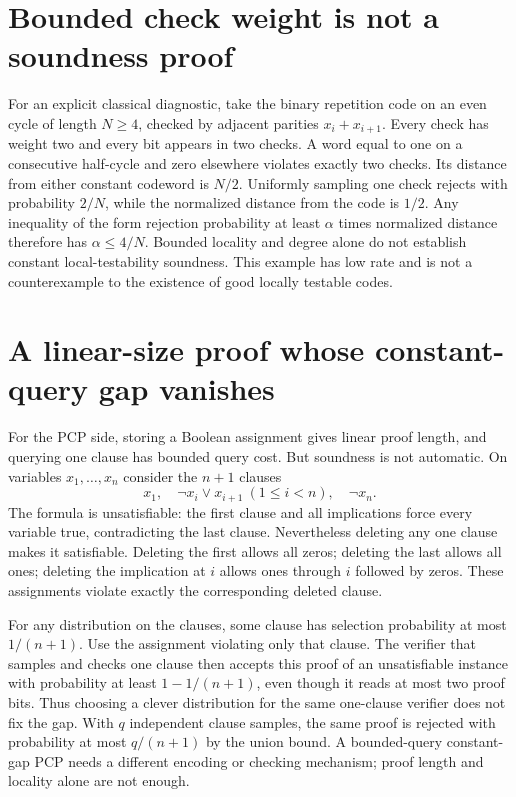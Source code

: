 \documentclass[11pt]{article}
\begin{document}
\section{Bounded check weight is not a soundness proof}
For an explicit classical diagnostic, take the binary repetition
code on an even cycle of length $N\ge4$, checked by adjacent
parities $x_i+x_{i+1}$. Every check has weight two and every
bit appears in two checks. A word equal to one on a consecutive
half-cycle and zero elsewhere violates exactly two checks.
Its distance from either constant codeword is $N/2$.
Uniformly sampling one check rejects with probability $2/N$,
while the normalized distance from the code is $1/2$.
Any inequality of the form rejection probability at least
$\alpha$ times normalized distance therefore has
$\alpha\le4/N$. Bounded locality and degree alone do not
establish constant local-testability soundness. This example
has low rate and is not a counterexample to the existence of
good locally testable codes.

\section{A linear-size proof whose constant-query gap vanishes}
For the PCP side, storing a Boolean assignment gives linear
proof length, and querying one clause has bounded query cost.
But soundness is not automatic. On variables $x_1,\ldots,x_n$
consider the $n+1$ clauses
\[
 x_1,\quad \neg x_i\vee x_{i+1}\ (1\le i<n),\quad \neg x_n.
\]
The formula is unsatisfiable: the first clause and all implications
force every variable true, contradicting the last clause.
Nevertheless deleting any one clause makes it satisfiable.
Deleting the first allows all zeros; deleting the last allows
all ones; deleting the implication at $i$ allows ones through
$i$ followed by zeros. These assignments violate exactly the
corresponding deleted clause.

For any distribution on the clauses, some clause has selection
probability at most $1/(n+1)$. Use the assignment violating
only that clause. The verifier that samples and checks one
clause then accepts this proof of an unsatisfiable instance
with probability at least $1-1/(n+1)$, even though it reads
at most two proof bits. Thus choosing a clever distribution
for the same one-clause verifier does not fix the gap. With
$q$ independent clause samples, the same proof is rejected
with probability at most $q/(n+1)$ by the union bound.
A bounded-query constant-gap PCP needs a different encoding
or checking mechanism; proof length and locality alone are
not enough.
\end{document}
